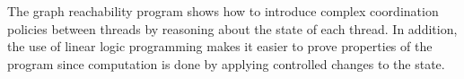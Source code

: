 The graph reachability program shows how to introduce complex coordination
policies between threads by reasoning about the state of each thread. In
addition, the use of linear logic programming makes it easier to prove
properties of the program since computation is done by applying controlled
changes to the state.


\clearpage
